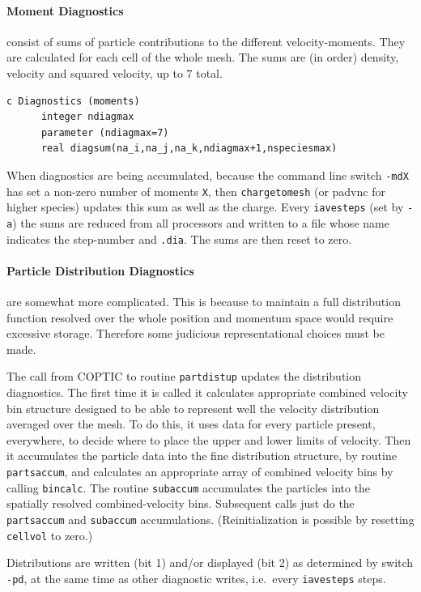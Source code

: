\documentclass[12pt]{article}
\begin{document}
\paragraph{Moment Diagnostics} consist of sums of particle
contributions to the different velocity-moments. They are calculated
 for each cell of the whole mesh. The sums are (in order) density,
 velocity and squared velocity, up to 7 total.
\begin{verbatim}
c Diagnostics (moments)
      integer ndiagmax
      parameter (ndiagmax=7)
      real diagsum(na_i,na_j,na_k,ndiagmax+1,nspeciesmax)
\end{verbatim}
 When diagnostics are being accumulated, because the command line
 switch \verb!-mdX! has set a non-zero number of moments \verb!X!,
 then \verb!chargetomesh! (or padvnc for higher species) updates this
 sum as well as the charge. Every \verb!iavesteps! (set by \verb!-a!)
 the sums are reduced from all processors and written to a file whose
 name indicates the step-number and \verb!.dia!. The sums are then
 reset to zero.

\paragraph{Particle Distribution Diagnostics} are somewhat more
complicated. This is because to maintain a full distribution function
resolved over the whole position and momentum space would require
excessive storage. Therefore some judicious representational choices
must be made. 

The call from COPTIC to routine \verb!partdistup! updates
the distribution diagnostics. The first time it is called it
calculates appropriate combined velocity bin structure designed to be able to
represent well the velocity distribution averaged over the mesh. To do
this, it uses data for every particle present, everywhere, to decide
where to place the upper and lower limits of velocity. Then it
accumulates the particle data into the fine distribution structure, by
routine \verb!partsaccum!, and calculates an appropriate array of
combined velocity bins by calling \verb!bincalc!. The routine
\verb!subaccum! accumulates the particles into the spatially resolved
combined-velocity bins. Subsequent calls just do the \verb!partsaccum!
and \verb!subaccum! accumulations. (Reinitialization is possible by
resetting \verb!cellvol! to zero.)

Distributions are written (bit 1) and/or displayed (bit 2) as
determined by switch \verb!-pd!, at the same time as other diagnostic
writes, i.e.\ every \verb!iavesteps! steps. 
\end{document}
